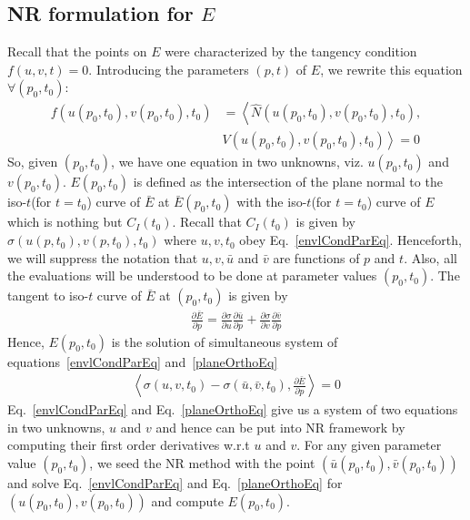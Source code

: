 \documentclass{elsart5p}
\begin{document}
\subsection{NR formulation for ${E}$} \label{NRFormSubSec}

Recall that the points on ${E}$ were characterized by the tangency condition $f(u,v,t) = 0$.  
Introducing the parameters $(p,t)$ of ${E}$, we rewrite this equation $\forall (p_0, t_0)$:
\begin{align} \label{envlCondParEq}
\nonumber f(u(p_0,t_0), v(p_0,t_0), t_0 )  &= \left < \hat{N}(u(p_0,t_0), v(p_0,t_0), t_0), \right . \\
			&\left . V(u(p_0,t_0), v(p_0,t_0), t_0) \right > = 0
\end{align}
So, given $(p_0,t_0)$, we have one equation in two unknowns, viz. $u(p_0,t_0)$ and $v(p_0, t_0)$. ${E}(p_0,t_0)$ is defined as the 
intersection of the plane normal to the iso-$t$(for $t=t_0$) curve of $\bar{{E}}$ at $\bar{{E}}(p_0,t_0)$ with the iso-$t$(for $t=t_0$) 
curve of ${E}$ which is nothing but $C_I(t_0)$. Recall that $C_I(t_0)$ is given by $\sigma(u(p, t_0), v(p, t_0), t_0)$ where $u, v, t_0$ obey Eq.~\ref{envlCondParEq}.  
Henceforth, we will suppress the notation that $u,v, \bar{u}$ and $\bar{v}$ are functions of $p$ and $t$.  Also, all the evaluations will be 
understood to be done at parameter values $(p_0,t_0)$.  The tangent to iso-$t$ curve of $\bar{{E}}$ at $(p_0,t_0)$  is given by 
\begin{align}
\frac{\partial \bar{{E}}}{\partial p} =\frac{\partial \sigma}{\partial u} \frac{\partial \bar{u}}{\partial p} + \frac{\partial \sigma}{\partial v} \frac{\partial \bar{v}}{\partial p}
\end{align}
Hence, ${E}(p_0,t_0)$ is the solution of simultaneous system of equations~\ref{envlCondParEq} and~\ref{planeOrthoEq}
\begin{align} \label{planeOrthoEq}
\left < \sigma(u, v ,t_0) - \sigma(\bar{u}, \bar{v}, t_0)   ,   \frac{\partial \bar{{E}}}{\partial p} \right > = 0 
\end{align}
Eq.~\ref{envlCondParEq} and Eq.~\ref{planeOrthoEq} give us a system of two equations in two unknowns, $u$ and $v$ and hence can be put into NR 
framework by computing their first order derivatives w.r.t $u$ and $v$.  For any given parameter value $(p_0,t_0)$, we seed the NR method with the 
point $(\bar{u}(p_0,t_0), \bar{v}(p_0,t_0))$ and solve  Eq.~\ref{envlCondParEq} and Eq.~\ref{planeOrthoEq} for $(u(p_0,t_0), v(p_0,t_0))$ and compute ${E}(p_0,t_0)$.
\end{document}

